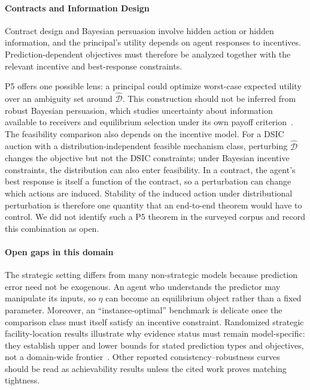 \documentclass[acmsmall,screen,nonacm]{acmart}
\theoremstyle{acmdefinition}%
\begin{document}
\paragraph{Contracts and Information Design}
Contract design and Bayesian persuasion involve hidden action or hidden information, and the principal's utility depends on agent responses to incentives. Prediction-dependent objectives must therefore be analyzed together with the relevant incentive and best-response constraints.

P5 offers one possible lens: a principal could optimize worst-case expected utility over an ambiguity set around $\hat{\mathcal{D}}$. This construction should not be inferred from robust Bayesian persuasion, which studies uncertainty about information available to receivers and equilibrium selection under its own payoff criterion~\cite{dworczak2022robust}. The feasibility comparison also depends on the incentive model. For a DSIC auction with a distribution-independent feasible mechanism class, perturbing $\hat{\mathcal{D}}$ changes the objective but not the DSIC constraints; under Bayesian incentive constraints, the distribution can also enter feasibility. In a contract, the agent's best response is itself a function of the contract, so a perturbation can change which actions are induced. Stability of the induced action under distributional perturbation is therefore one quantity that an end-to-end theorem would have to control. We did not identify such a P5 theorem in the surveyed corpus and record this combination as open.

\paragraph*{Open gaps in this domain}
The strategic setting differs from many non-strategic models because prediction error need not be exogenous. An agent who understands the predictor may manipulate its inputs, so $\eta$ can become an equilibrium object rather than a fixed parameter. Moreover, an ``instance-optimal'' benchmark is delicate once the comparison class must itself satisfy an incentive constraint. Randomized strategic facility-location results illustrate why evidence status must remain model-specific: they establish upper and lower bounds for stated prediction types and objectives, not a domain-wide frontier~\cite{balkanski2024randomized}. Other reported consistency--robustness curves should be read as achievability results unless the cited work proves matching tightness.
\end{document}
